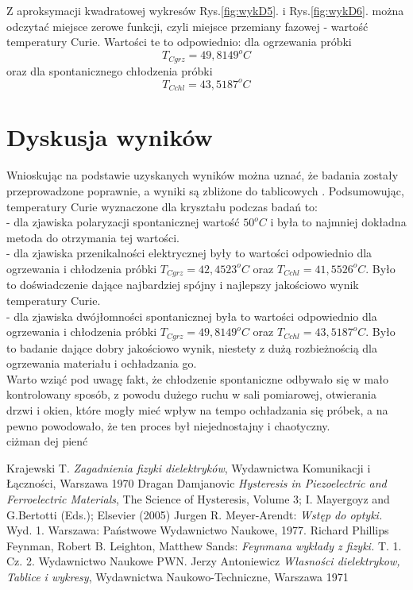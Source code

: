 \documentclass{article}
\begin{document}
Z aproksymacji kwadratowej wykresów Rys.\ref{fig:wykD5}. i Rys.\ref{fig:wykD6}. można odczytać miejsce zerowe funkcji, czyli miejsce przemiany fazowej - wartość temperatury Curie. Wartości te to odpowiednio: dla ogrzewania próbki
\begin{equation}
T_{C grz}=49,8149^{o}C
\end{equation}
oraz dla spontanicznego chłodzenia próbki
\begin{equation}
T_{C chl}=43,5187^{o}C
\end{equation}

\section{Dyskusja wyników}
Wnioskując na podstawie uzyskanych wyników można uznać, że badania zostały przeprowadzone poprawnie, a wyniki są zbliżone do tablicowych \cite{antoniewicz}. Podsumowując, temperatury Curie wyznaczone dla kryształu podczas badań to:\\
- dla zjawiska polaryzacji spontanicznej wartość $50^{o}C$ i była to najmniej dokładna metoda do otrzymania tej wartości.\\
- dla zjawiska przenikalności elektrycznej były to wartości odpowiednio dla ogrzewania i chłodzenia próbki $T_{C grz}=42,4523^{o}C$ oraz $T_{C chl}=41,5526^{o}C$. Było to doświadczenie dające najbardziej spójny i najlepszy jakościowo wynik temperatury Curie.\\
- dla zjawiska dwójłomności spontanicznej była to wartości odpowiednio dla ogrzewania i chłodzenia próbki $T_{C grz}=49,8149^{o}C$ oraz $T_{C chl}=43,5187^{o}C$. Było to badanie dające dobry jakościowo wynik, niestety z dużą rozbieżnością dla ogrzewania materiału i ochładzania go.\\
Warto wziąć pod uwagę fakt, że chłodzenie spontaniczne odbywało się w mało kontrolowany sposób, z powodu dużego ruchu w sali pomiarowej, otwierania drzwi i okien, które mogły mieć wpływ na tempo ochładzania się próbek, a na pewno powodowało, że ten proces był niejednostajny i chaotyczny.
\\ciżman dej pienć

\begin{thebibliography}{99}
	 Krajewski T. \textit{Zagadnienia fizyki dielektryków}, Wydawnictwa Komunikacji i Łączności, Warszawa 1970 
	Dragan Damjanovic \textit{Hysteresis in Piezoelectric
and Ferroelectric Materials}, The Science of Hysteresis, Volume 3; I. Mayergoyz and G.Bertotti (Eds.); Elsevier (2005)
	 Jurgen R. Meyer-Arendt: \textit{Wstęp do optyki.} Wyd. 1. Warszawa: Państwowe Wydawnictwo Naukowe, 1977.
	 Richard Phillips Feynman, Robert B. Leighton, Matthew Sands: \textit{Feynmana wykłady z fizyki.} T. 1. Cz. 2. Wydawnictwo Naukowe PWN.
	 Jerzy Antoniewicz \textit{Własności dielektrykow, Tablice i wykresy}, Wydawnictwa Naukowo-Techniczne, Warszawa 1971
\end{thebibliography}
\end{document}
